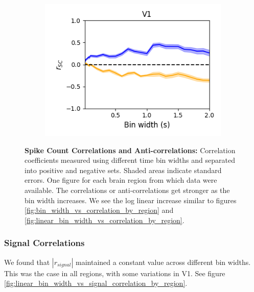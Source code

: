 \documentclass[a4paper,12pt]{article}
\theoremstyle{definition}
\begin{document}
\begin{figure}[p]
\begin{subfigure}{0.5\textwidth}
    \includegraphics[width=\textwidth]{figures/linear_bin_width_relative_correlations_v1_6.png}
  \end{subfigure}
  \caption{\textbf{Spike Count Correlations and Anti-correlations:} Correlation coefficients measured using different time bin widths and separated into positive and negative sets. Shaded areas indicate standard errors. One figure for each brain region from which data were available. The correlations or anti-correlations get stronger as the bin width increases. We see the log linear increase similar to figures \ref{fig:bin_width_vs_correlation_by_region} and \ref{fig:linear_bin_width_vs_correlation_by_region}.}
  \label{fig:corr_anti_corr_by_region}
\end{figure}

\subsubsection{Signal Correlations}
We found that $|r_{signal}|$ maintained a constant value across different bin widths. This was the case in all regions, with some variations in V1. See figure \ref{fig:linear_bin_width_vs_signal_correlation_by_region}.
\end{document}
